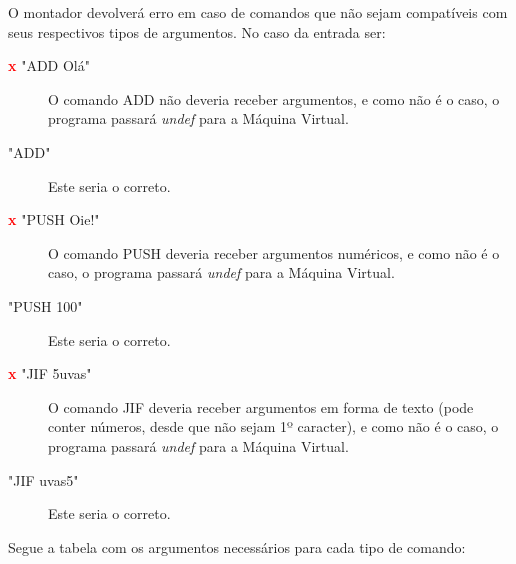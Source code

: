 \documentclass[a4paper]{article}
\begin{document}
    O montador devolverá erro em caso de comandos que não sejam 
    compatíveis com seus respectivos tipos de argumentos. No caso da
    entrada ser: 
    
    \begin{description}


        \item [\textbf{\textcolor{red}{x}} "ADD Olá"] 
        O comando ADD não deveria receber argumentos, e como não é o 
        caso, o programa passará \emph{undef} para a Máquina Virtual.
        
        \item [\textcolor{green}{\checkmark} "ADD"] 
        Este seria o correto.
        
        \item[] %
        
        \item [\textbf{\textcolor{red}{x}} "PUSH Oie!"] 
        O comando PUSH deveria receber argumentos numéricos, e como não é 
        o caso, o programa passará \emph{undef} para a Máquina Virtual.
    
        \item [\textcolor{green}{\checkmark} "PUSH 100"] 
        Este seria o correto.
        
        \item[] %
        
        \item [\textbf{\textcolor{red}{x}} "JIF 5uvas"] 
        O comando JIF deveria receber argumentos em forma de texto (pode
        conter números, desde que não sejam 1º caracter), e como não é o
        caso, o programa passará \emph{undef} para a Máquina Virtual.
        
        \item [\textcolor{green}{\checkmark} "JIF uvas5"] 
        Este seria o correto.


    \end{description}

    \bigskip\bigskip

    Segue a tabela com os argumentos necessários para cada tipo de 
    comando:
    
\end{document}
